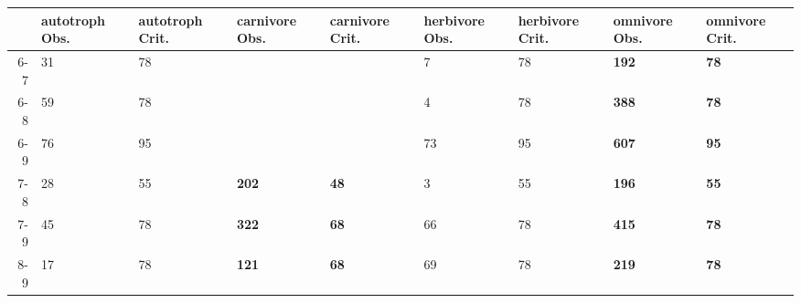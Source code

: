 \begin{table}[ht]
\centering
\begin{tabular}{rllllllll}
  \toprule
 & autotroph Obs. & autotroph Crit. & carnivore Obs. & carnivore Crit. & herbivore Obs. & herbivore Crit. & omnivore Obs. & omnivore Crit. \\ 
  \midrule
6-7 & 31 & 78 &  &  & 7 & 78 & \textbf{192} & \textbf{78} \\ 
  6-8 & 59 & 78 &  &  & 4 & 78 & \textbf{388} & \textbf{78} \\ 
  6-9 & 76 & 95 &  &  & 73 & 95 & \textbf{607} & \textbf{95} \\ 
  7-8 & 28 & 55 & \textbf{202} & \textbf{48} & 3 & 55 & \textbf{196} & \textbf{55} \\ 
  7-9 & 45 & 78 & \textbf{322} & \textbf{68} & 66 & 78 & \textbf{415} & \textbf{78} \\ 
  8-9 & 17 & 78 & \textbf{121} & \textbf{68} & 69 & 78 & \textbf{219} & \textbf{78} \\ 
   \bottomrule
\end{tabular}
\end{table}
